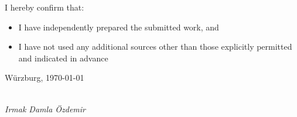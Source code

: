 \newpage
\thispagestyle{empty}
\noindent

I hereby confirm that:
\begin{itemize}
    \item I have independently prepared the submitted work, and
    \item I have not used any additional sources other than those explicitly permitted and indicated in advance
\end{itemize}

\vspace{2cm}

\noindent
Würzburg, \today

\vspace{3cm}

\hspace*{7cm}%
\dotfill\\
\hspace*{8.5cm}%
\textit{Irmak Damla Özdemir}